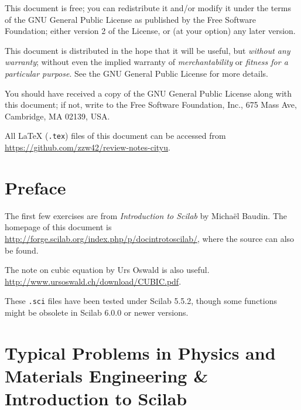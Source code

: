 \documentclass[a4paper]{book}
\begin{document}
\begin{titlepage}

\vfill %
\end{titlepage}

\noindent

This document is free; you can redistribute it and/or modify it under the terms of 
the GNU General Public License as published by the Free Software Foundation; either 
version 2 of the License, or (at your option) any later version.

This document is distributed in the hope that it will be useful, but \emph{without any 
warranty}; without even the implied warranty of \emph{merchantability} or \emph{fitness 
for a particular purpose}. See the GNU General Public License for more details.

You should have received a copy of the GNU General Public License along with this document; 
if not, write to the Free Software Foundation, Inc., 675 Mass Ave, Cambridge, MA 02139, USA.

All \LaTeX{} (\texttt{.tex}) files of this document can be accessed from
\url{https://github.com/zzw42/review-notes-cityu}.


\tableofcontents

\chapter*{Preface}
The first few exercises are from \emph{Introduction to Scilab} by Micha\"{e}l Baudin.
The homepage of this document is 
\url{http://forge.scilab.org/index.php/p/docintrotoscilab/}, where the source can also be
found.

The note on cubic equation by Urs Oswald is also 
useful. \url{http://www.ursoswald.ch/download/CUBIC.pdf}.

These {\tt .sci} files have been tested under Scilab 5.5.2, though some
functions might be obsolete in Scilab 6.0.0 or newer versions.

\mainmatter
\chapter[Typical Problems]{Typical Problems in Physics and Materials Engineering
\& Introduction to Scilab}
% 
\end{document}
